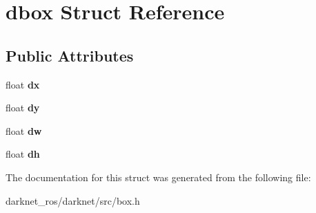 \hypertarget{structdbox}{}\section{dbox Struct Reference}
\label{structdbox}
\subsection*{Public Attributes}
\begin{DoxyCompactItemize}
\item 
\mbox{\label{structdbox_af24e1ef9eae9dbcfefbcd86cc7ab342f}} 
float {\bfseries dx}
\item 
\mbox{\label{structdbox_acfa3fcbd522bc347d91b27229a935e1b}} 
float {\bfseries dy}
\item 
\mbox{\label{structdbox_a2d3a509dafd2b6c42326e0a008b1d929}} 
float {\bfseries dw}
\item 
\mbox{\label{structdbox_a8321cbf92c464ba9c4eca5b8f0e9f48b}} 
float {\bfseries dh}
\end{DoxyCompactItemize}


The documentation for this struct was generated from the following file\+:\begin{DoxyCompactItemize}
\item 
darknet\+\_\+ros/darknet/src/box.\+h\end{DoxyCompactItemize}
